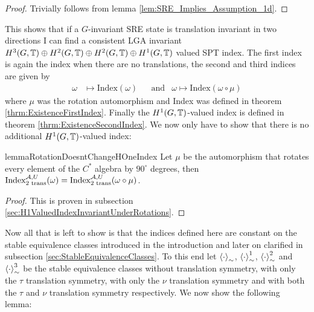 \documentclass[11pt,a4paper,twoside]{article}
\numberwithin{equation}{section}
\begin{document}
	\begin{proof}
		Trivially follows from lemma \ref{lem:SRE_Implies_Assumption_1d}.
	\end{proof}
	This shows that if a $G$-invariant SRE state is translation invariant in two directions I can find a consistent LGA invariant $H^3(G,\TT)\oplus H^2(G,\TT)\oplus H^2(G,\TT)\oplus H^1(G,\TT)$ valued SPT index. The first index is again the index when there are no translations, the second and third indices are given by
	\begin{align}
		\omega&\mapsto \textrm{Index}(\omega)&&\text{and}&\omega\mapsto \textrm{Index}(\omega\circ\mu)
	\end{align}
	where $\mu$ was the rotation automorphism and Index was defined in theorem \ref{thrm:ExistenceFirstIndex}. Finally the $H^1(G,\TT)$-valued index is defined in theorem \ref{thrm:ExistenceSecondIndex}. We now only have to show that there is no additional $H^1(G,\TT)$-valued index:
	\begin{restatable}{lemma}{RotationDoesntChangeHOneIndex}\label{lem:RotationDoesn'tChangeH1Index}
		Let $\mu$ be the automorphism that rotates every element of the $C^*$ algebra by $90^\circ$ degrees, then $\textrm{Index}_{\text{2 trans}}^{\AA,U}(\omega)=\textrm{Index}_{\text{2 trans}}^{\AA,U}(\omega\circ\mu)$.
	\end{restatable}
	\begin{proof}
		This is proven in subsection \ref{sec:H1ValuedIndexInvariantUnderRotations}.
	\end{proof}
	Now all that is left to show is that the indices defined here are constant on the stable equivalence classes introduced in the introduction and later on clarified in subsection \ref{sec:StableEquivalenceClasses}. To this end let $\expval{\cdot}_\sim$, $\expval{\cdot}_\sim^1$, $\expval{\cdot}_\sim^2$ and $\expval{\cdot}_\sim^3$ be the stable equivalence classes without translation symmetry, with only the $\tau$ translation symmetry, with only the $\nu$ translation symmetry and with both the $\tau$ and $\nu$ translation symmetry respectively. We now show the following lemma:
\end{document}
